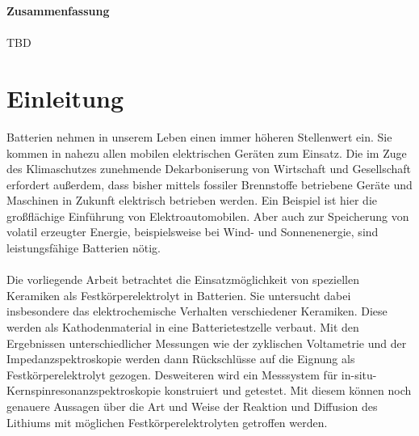 \documentclass[a4paper, 11pt, headsepline,footsepline,twoside,abstract]{scrbook}
\begin{document}
\newpage

\textbf{\Large{Zusammenfassung}}
\\\\
TBD
\pagestyle{toc}
\renewcommand*{\chapterpagestyle}{toc} %
\tableofcontents
{} 
\newpage
\cleardoubleemptypage
\pagestyle{normal}
\renewcommand*{\chapterpagestyle}{plain}
\setcounter{page}{1}
\chapter{Einleitung}
Batterien nehmen in unserem Leben einen immer höheren Stellenwert ein. Sie kommen in nahezu allen mobilen elektrischen Geräten zum Einsatz. Die im Zuge des Klimaschutzes zunehmende Dekarboniserung von Wirtschaft und Gesellschaft erfordert außerdem, dass bisher mittels fossiler Brennstoffe betriebene Geräte und Maschinen in Zukunft elektrisch betrieben werden. Ein Beispiel ist hier die großflächige Einführung von Elektroautomobilen. Aber auch zur Speicherung von volatil erzeugter Energie, beispielsweise bei Wind- und Sonnenenergie, sind leistungsfähige Batterien nötig.
\\\\
Die vorliegende Arbeit betrachtet die Einsatzmöglichkeit von speziellen Keramiken als Festkörperelektrolyt in Batterien. Sie untersucht dabei insbesondere das elektrochemische Verhalten verschiedener Keramiken. Diese werden als Kathodenmaterial in eine Batterietestzelle verbaut. Mit den Ergebnissen unterschiedlicher Messungen wie der zyklischen Voltametrie und der Impedanzspektroskopie werden dann Rückschlüsse auf die Eignung als Festkörperelektrolyt gezogen. Desweiteren wird ein Messsystem für in-situ-Kernspinresonanzspektroskopie konstruiert und getestet. Mit diesem können noch genauere Aussagen über die Art und Weise der Reaktion und Diffusion des Lithiums mit möglichen Festkörperelektrolyten getroffen werden.
\end{document}
